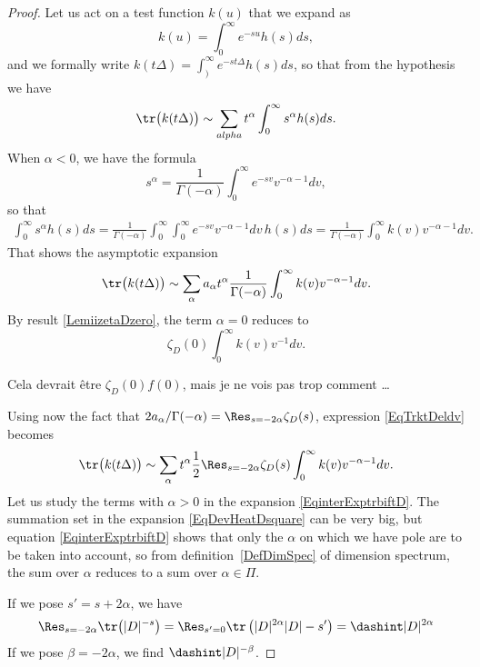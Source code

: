 \begin{proof}
	Let us act on a test function $k(u)$ that we expand as
	\[
		k(u)=\int_0^{\infty} e^{-su}h(s)ds,
	\]
	and we formally write $k(t\Delta)=\int_)^{\infty} e^{-st\Delta}h(s)ds$, so that from the hypothesis we have
	\begin{equation}
		\tr\big( k(t\Delta) \big)\sim \sum_{alpha}t^{\alpha}\int_0^\infty s^{\alpha}h(s)ds.
	\end{equation}
	When $\alpha<0$, we have the formula
	\[
		s^{\alpha}=\frac{1}{ \Gamma(-\alpha) }\int_0^{\infty} e^{-sv}v^{-\alpha-1}dv,
	\]
	so that
	\begin{align*}
		\int_0^{\infty}s^{\alpha}h(s)ds	=\frac{1}{ \Gamma(-\alpha) }\int_0^{\infty}\int_0^{\infty} e^{-sv}v^{-\alpha-1}dv\,h(s)ds
		=\frac{1}{ \Gamma(-\alpha) }\int_0^{\infty}k(v)v^{-\alpha-1}dv.
	\end{align*}
	That shows the asymptotic expansion
	\begin{equation}		\label{EqTrktDeldv}
		\tr\big( k(t\Delta) \big)\sim \sum_{\alpha}a_{\alpha}t^{\alpha}\frac{1}{ \Gamma(-\alpha) }\int_0^{\infty}k(v)v^{-\alpha-1}dv.
	\end{equation}
	By result \eqref{LemiizetaDzero}, the term $\alpha=0$ reduces to
	\[
		\zeta_D(0)\int_0^{\infty}k(v)v^{-1}dv.
	\]
	\begin{probleme}
		Cela devrait être $\zeta_D(0)f(0)$, mais je ne vois pas trop comment \ldots
	\end{probleme}
	Using now the fact that $2 a_{\alpha}/\Gamma(-\alpha)=\Res_{s=-2\alpha}\zeta_D(s)$, expression \eqref{EqTrktDeldv} becomes
	\begin{equation}		\label{EqinterExptrbiftD}
		\tr\big( k(t\Delta) \big)\sim \sum_{\alpha}t^{\alpha}\frac{ 1 }{2}\Res_{s=-2\alpha}\zeta_D(s)\int_0^{\infty}k(v)v^{-\alpha-1}dv.
	\end{equation}
	Let us study the terms with $\alpha>0$ in the expansion \eqref{EqinterExptrbiftD}. The summation set in the expansion \eqref{EqDevHeatDsquare} can be very big, but equation \eqref{EqinterExptrbiftD} shows that only the $\alpha$ on which we have pole are to be taken into account, so from definition~\ref{DefDimSpec} of dimension spectrum, the sum over $\alpha$ reduces to a sum over $\alpha\in\Pi$.

	If we pose $s'=s+2\alpha$, we have
	\[
		\Res_{s=-2\alpha}\tr\big( | D |^{-s} \big)=\Res_{s'=0}\tr\left( | D |^{2\alpha}| D |-s' \right)=\dashint| D |^{2\alpha}
	\]
	If we pose $\beta=-2\alpha$, we find $\dashint| D |^{-\beta}$.

\end{proof}

